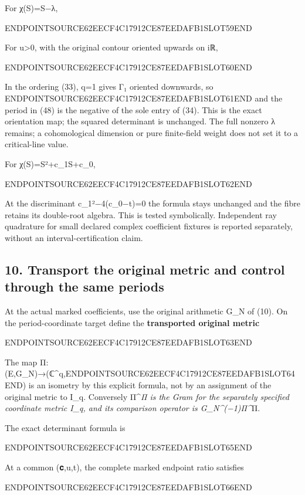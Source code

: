 For χ(S)=S−λ,

ENDPOINTSOURCE62EECF4C17912CE87EEDAFB1SLOT59END

For u\textgreater0, with the original contour oriented upwards on iℝ,

ENDPOINTSOURCE62EECF4C17912CE87EEDAFB1SLOT60END

In the ordering (33), q=1 gives Γ₁ oriented downwards, so ENDPOINTSOURCE62EECF4C17912CE87EEDAFB1SLOT61END and the period in (48) is the negative of the sole entry of (34). This is the exact orientation map; the squared determinant is unchanged. The full nonzero λ remains; a cohomological dimension or pure finite-field weight does not set it to a critical-line value.

For χ(S)=S²+c\_1S+c\_0,

ENDPOINTSOURCE62EECF4C17912CE87EEDAFB1SLOT62END

At the discriminant c\_1²−4(c\_0−t)=0 the formula stays unchanged and the fibre retains its double-root algebra. This is tested symbolically. Independent ray quadrature for small declared complex coefficient fixtures is reported separately, without an interval-certification claim.

\subsection{10. Transport the original metric and control through the same periods}\label{endpoint-sga_trace_period--transport-the-original-metric-and-control-through-the-same-periods}

At the actual marked coefficients, use the original arithmetic G\_N of (10). On the period-coordinate target define the \textbf{transported original metric}

ENDPOINTSOURCE62EECF4C17912CE87EEDAFB1SLOT63END

The map Π:(E,G\_N)→(ℂ\^{}q,ENDPOINTSOURCE62EECF4C17912CE87EEDAFB1SLOT64END) is an isometry by this explicit formula, not by an assignment of the original metric to I\_q. Conversely Π\^{}\emph{Π is the Gram for the separately specified coordinate metric I\_q, and its comparison operator is G\_N\^{}(−1)Π\^{}}Π.

The exact determinant formula is

ENDPOINTSOURCE62EECF4C17912CE87EEDAFB1SLOT65END

At a common (𝐜,u,t), the complete marked endpoint ratio satisfies

ENDPOINTSOURCE62EECF4C17912CE87EEDAFB1SLOT66END

